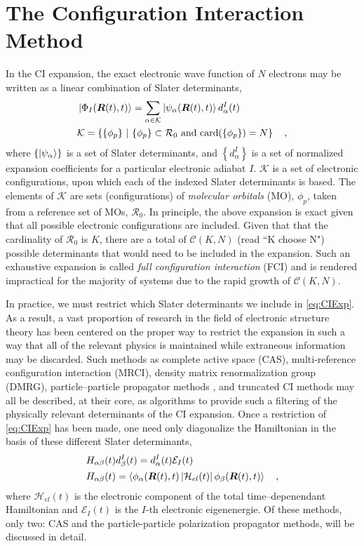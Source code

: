 \section{The Configuration Interaction Method}
\label{sec:ci}

In the CI expansion, the exact electronic wave function of $N$ electrons may be
written as a linear combination of Slater determinants,
\begin{align}
&\left\vert \Phi_I (\boldsymbol{R}(t),t) \right\rangle = \sum_{\alpha \in \mathcal{K}}  
  \left\vert \psi_\alpha (\boldsymbol{R}(t),t) \right\rangle d^I_\alpha(t)
\label{eq:CIExp} \\
& \mathcal{K} = \left\lbrace \{ \phi_p \} \text{ }\vert\text{ } \{ \phi_p \} \subset
\mathcal{R}_0 \text{ and } \mathrm{card}(\{ \phi_p \}) = N \right\rbrace
\quad ,
\end{align}
where $\left\lbrace\left\vert \psi_\alpha \right\rangle\right\rbrace$ is a set of Slater
determinants, and $\left\lbrace d^I_\alpha \right\rbrace$ is a set of normalized
expansion coefficients for a particular electronic adiabat $I$. $\mathcal{K}$ is
a set of electronic configurations, upon which each of the indexed Slater
determinants is based. The elements of $\mathcal{K}$ are sets (configurations)
of \emph{molecular orbitals} (MO), $\phi_p$, taken from a reference set of MOs,
$\mathcal{R}_0$.  In principle, the above expansion is exact given that all
possible electronic configurations are included.  Given that that the
cardinality of $\mathcal{R}_0$ is $K$, there are a total of $\mathcal{C}(K,N)$
(read ``K choose N") possible determinants that would need to be included in the
expansion. Such an exhaustive expansion is called \emph{full configuration
interaction} (FCI) and is rendered impractical for the majority of systems due
to the rapid growth of $\mathcal{C}(K,N)$.  

In practice, we  must restrict which Slater determinants we include in
\cref{eq:CIExp}. As a result, a vast proportion of research in the field of
electronic structure theory has been centered on the proper way to restrict the
expansion in such a way that all of the relevant physics is maintained while
extraneous information may be discarded. Such methods as complete active space
(CAS), multi-reference configuration interaction (MRCI), density matrix
renormalization group (DMRG), particle--particle propagator methods , and
truncated CI methods may all be described, at their core, as algorithms to
provide such a filtering of the physically relevant determinants of the CI
expansion.  Once a restriction of \cref{eq:CIExp} has been made, one need only
diagonalize the Hamiltonian in the basis of these different Slater determinants,
\begin{align}
&H_{\alpha\beta}(t) d_\beta^I(t) = d_\alpha^I(t) \mathcal{E}_I(t)
\label{eq:CIEig}\\
&H_{\alpha\beta}(t) =
\left\langle \phi_\alpha(\boldsymbol{R}(t),t) \left\vert \mathcal{H}_{el}(t) \right\vert \phi_\beta(\boldsymbol{R}(t),t) \right\rangle
\quad,
\end{align}
where $\mathcal{H}_{el}(t)$ is the electronic component of the total
time--depenendant Hamiltonian and $\mathcal{E}_I(t)$ is the $I$-th electronic
eigenenergie. 
Of these methods, only two: CAS and the particle-particle polarization
propagator methods, will be discussed in detail. 

